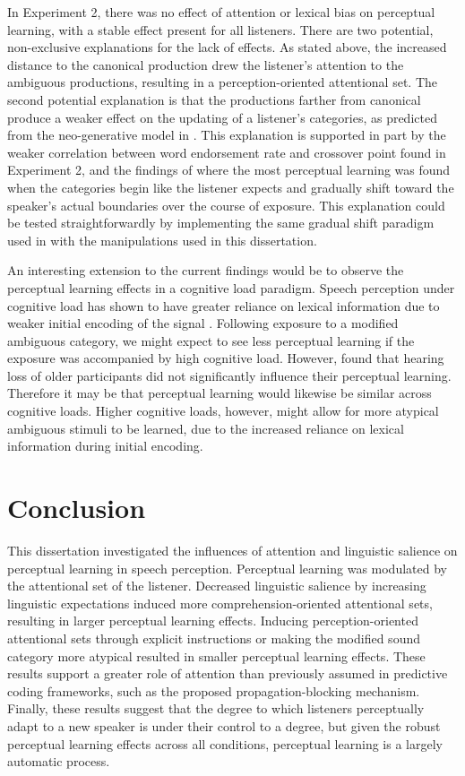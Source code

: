 In Experiment 2, there was no effect of attention or lexical bias on perceptual learning, with a stable effect present for all listeners.
There are two potential, non-exclusive explanations for the lack of effects.
As stated above, the increased distance to the canonical production drew the listener's attention to the ambiguous productions, resulting in a perception-oriented attentional set.
The second potential explanation is that the productions farther from canonical produce a weaker effect on the updating of a listener's categories, as predicted from the neo-generative model in \citep{Pierrehumbert2002}.
This explanation is supported in part by the weaker correlation between word endorsement rate and crossover point found in Experiment 2, and the findings of \citet{Sumner2011} where the most perceptual learning was found when the categories begin like the listener expects and gradually shift toward the speaker's actual boundaries over the course of exposure.
This explanation could be tested straightforwardly by implementing the same gradual shift paradigm used in \citet{Sumner2011} with the manipulations used in this dissertation.

An interesting extension to the current findings would be to observe the perceptual learning effects in a cognitive load paradigm.  Speech perception under cognitive load has shown to have greater reliance on lexical information due to weaker initial encoding of the signal \citep{Mattys2011}.  Following exposure to a modified ambiguous category, we might expect to see less perceptual learning if the exposure was accompanied by high cognitive load.  However, \citet{Scharenborg2014} found that hearing loss of older participants did not significantly influence their perceptual learning.  Therefore it may be that perceptual learning would likewise be similar across cognitive loads.
Higher cognitive loads, however, might allow for more atypical ambiguous stimuli to be learned, due to the increased reliance on lexical information during initial encoding.

\section{Conclusion}

This dissertation investigated the influences of attention and linguistic salience on perceptual learning in speech perception.
Perceptual learning was modulated by the attentional set of the listener.
Decreased linguistic salience by increasing linguistic expectations induced more comprehension-oriented attentional sets, resulting in larger perceptual learning effects.
Inducing perception-oriented attentional sets through explicit instructions or making the modified sound category more atypical resulted in smaller perceptual learning effects.
These results support a greater role of attention than previously assumed in predictive coding frameworks, such as the proposed propagation-blocking mechanism.
Finally, these results suggest that the degree to which listeners perceptually adapt to a new speaker is under their control to a degree, but given the robust perceptual learning effects across all conditions, perceptual learning is a largely automatic process.



